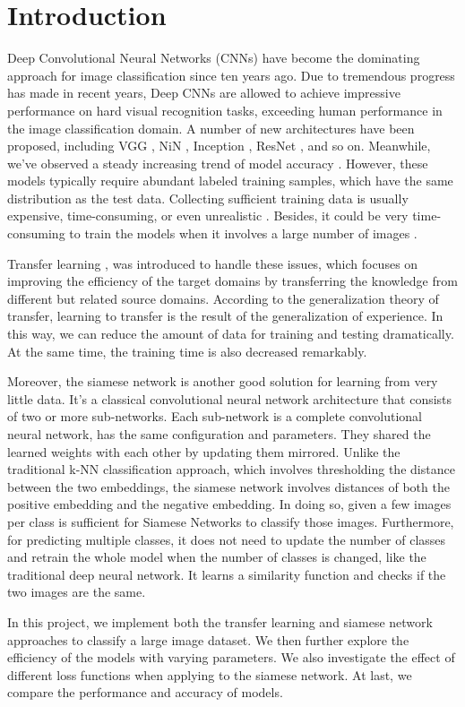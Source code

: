 \section{Introduction}

Deep Convolutional Neural Networks (CNNs) have become the dominating approach for image classification since ten years ago. Due to tremendous progress has made in recent years, Deep CNNs are allowed to achieve impressive performance on hard visual recognition tasks, exceeding human performance in the image classification domain. A number of new architectures have been proposed, including VGG \cite{simonyan2014very}, NiN \cite{lin2013network}, Inception \cite{chen2017rethinking}, ResNet \cite{he2016deep}, and so on. Meanwhile, we've observed a steady increasing trend of model accuracy \cite{he2019bag}. However, these models typically require abundant labeled training samples, which have the same distribution as the test data. Collecting sufficient training data is usually expensive, time-consuming, or even unrealistic \cite{zhuang2020comprehensive}. Besides, it could be very time-consuming to train the models when it involves a large number of images \cite{hussain2018study}.

Transfer learning \cite{shaha2018transfer}, was introduced to handle these issues, which focuses on improving the efficiency of the target domains by transferring the knowledge from different but related source domains. According to the generalization theory of transfer, learning to transfer is the result of the generalization of experience. In this way, we can reduce the amount of data for training and testing dramatically. At the same time, the training time is also decreased remarkably. 

Moreover, the siamese network \cite{he2018twofold} is another good solution for learning from very little data. It's a classical convolutional neural network architecture that consists of two or more sub-networks. Each sub-network is a complete convolutional neural network, has the same configuration and parameters. They shared the learned weights with each other by updating them mirrored. Unlike the traditional k-NN classification approach, which involves thresholding the distance between the two embeddings, the siamese network involves distances of both the positive embedding and the negative embedding.  In doing so, given a few images per class is sufficient for Siamese Networks to classify those images. Furthermore, for predicting multiple classes, it does not need to update the number of classes and retrain the whole model when the number of classes is changed, like the traditional deep neural network. It learns a similarity function and checks if the two images are the same. 

In this project, we implement both the transfer learning and siamese network approaches to classify a large image dataset. We then further explore the efficiency of the models with varying parameters. We also investigate the effect of different loss functions when applying to the siamese network. At last, we compare the performance and accuracy of models.  